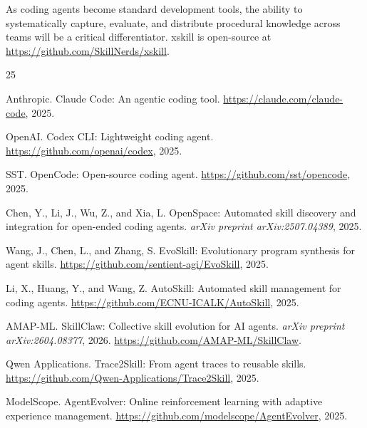 \documentclass{article}
\begin{document}
As coding agents become standard development tools, the ability to systematically capture, evaluate, and distribute procedural knowledge across teams will be a critical differentiator. xskill is open-source at \url{https://github.com/SkillNerds/xskill}.




\begin{thebibliography}{25}

Anthropic.
\newblock Claude Code: An agentic coding tool.
\newblock \url{https://claude.com/claude-code}, 2025.

OpenAI.
\newblock Codex CLI: Lightweight coding agent.
\newblock \url{https://github.com/openai/codex}, 2025.

SST.
\newblock OpenCode: Open-source coding agent.
\newblock \url{https://github.com/sst/opencode}, 2025.

Chen, Y., Li, J., Wu, Z., and Xia, L.
\newblock OpenSpace: Automated skill discovery and integration for open-ended coding agents.
\newblock \emph{arXiv preprint arXiv:2507.04389}, 2025.

Wang, J., Chen, L., and Zhang, S.
\newblock EvoSkill: Evolutionary program synthesis for agent skills.
\newblock \url{https://github.com/sentient-agi/EvoSkill}, 2025.

Li, X., Huang, Y., and Wang, Z.
\newblock AutoSkill: Automated skill management for coding agents.
\newblock \url{https://github.com/ECNU-ICALK/AutoSkill}, 2025.

AMAP-ML.
\newblock SkillClaw: Collective skill evolution for AI agents.
\newblock \emph{arXiv preprint arXiv:2604.08377}, 2026. \url{https://github.com/AMAP-ML/SkillClaw}.

Qwen Applications.
\newblock Trace2Skill: From agent traces to reusable skills.
\newblock \url{https://github.com/Qwen-Applications/Trace2Skill}, 2025.

ModelScope.
\newblock AgentEvolver: Online reinforcement learning with adaptive experience management.
\newblock \url{https://github.com/modelscope/AgentEvolver}, 2025.


\end{thebibliography}
\end{document}
